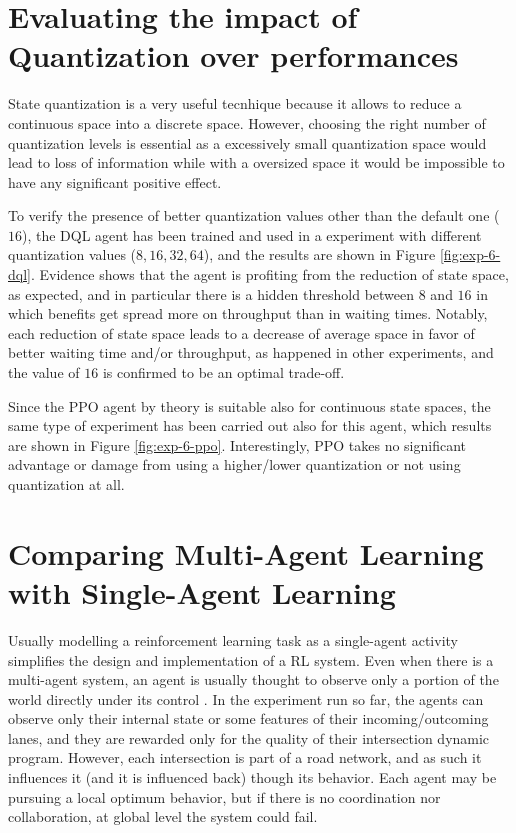 \section{Evaluating the impact of Quantization over performances}

State quantization is a very useful tecnhique because it allows to reduce a continuous space into a discrete space. However, choosing the right number of quantization levels is essential as a excessively small quantization space would lead to loss of information while with a oversized space it would be impossible to have any significant positive effect.

To verify the presence of better quantization values other than the default one ($16$), the DQL agent has been trained and used in a experiment with different quantization values ($8, 16, 32, 64$), and the results are shown in Figure \ref{fig:exp-6-dql}.
Evidence shows that the agent is profiting from the reduction of state space, as expected, and in particular there is a hidden threshold between $8$ and $16$ in which benefits get spread more on throughput than in waiting times.
Notably, each reduction of state space leads to a decrease of average space in favor of better waiting time and/or throughput, as happened in other experiments, and the value of $16$ is confirmed to be an optimal trade-off.

Since the PPO agent by theory is suitable also for continuous state spaces, the same type of experiment has been carried out also for this agent, which results are shown in Figure \ref{fig:exp-6-ppo}.
Interestingly, PPO takes no significant advantage or damage from using a higher/lower quantization or not using quantization at all.



\section{Comparing Multi-Agent Learning with Single-Agent Learning}

Usually modelling a reinforcement learning task as a single-agent activity simplifies the design and implementation of a RL system.
Even when there is a multi-agent system, an agent is usually thought to observe only a portion of the world directly under its control \cite{alegre2021quantifying}.
In the experiment run so far, the agents can observe only their internal state or some features of their incoming/outcoming lanes, and they are rewarded only for the quality of their intersection dynamic program.
However, each intersection is part of a road network, and as such it influences it (and it is influenced back) though its behavior.
Each agent may be pursuing a local optimum behavior, but if there is no coordination nor collaboration, at global level the system could fail.

